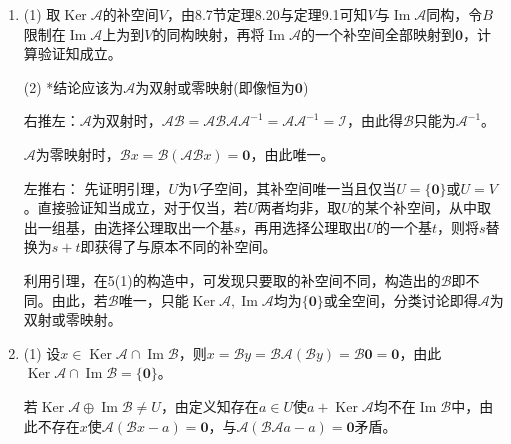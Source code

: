 \documentclass[a4paper,UTF8,fontset=windows]{ctexart}
\DeclareMathOperator{\im}{Im}
\DeclareMathOperator{\Ker}{Ker}
\begin{document}
\begin{enumerate}
(2) 由条件，若$x=\mathcal{A}y,\mathcal{B}x=\mathbf{0}$，则只有$x=\mathbf{0}$，因此限制在$\im\mathcal{A}$上的$\mathcal{B}$为单射。由此存在限制在$\im\mathcal{B}\mathcal{A}$上的$\mathcal{C}$(可验证其为线性映射)使得$\forall x\in\im\mathcal{A},\mathcal{C}\mathcal{B}x=\mathcal{B}x$，令$x=\mathcal{A}y$可发现其已经满足题目条件，再将$\im\mathcal{B}\mathcal{A}$的一个补空间全部映射到$\mathbf{0}$即可。

(3) 对$V$的一组基$\{c_i\}$，由条件可设$\mathcal{B}\mathcal{A}t_i=\mathcal{B}c_i$，则令$\mathcal{C}c_i=t_i$。利用线性性可验证对$V$中的元素均有$\mathcal{B}\mathcal{A}\mathcal{C}c=\mathcal{B}c$，由此知构造出的$\mathcal{C}$符合要求。

\item
(1) 取$\Ker\mathcal{A}$的补空间$V$，由8.7节定理8.20与定理9.1可知$V$与$\im\mathcal{A}$同构，令$B$限制在$\im\mathcal{A}$上为到$V$的同构映射，再将$\im\mathcal{A}$的一个补空间全部映射到$\mathbf{0}$，计算验证知成立。

(2) *结论应该为$\mathcal{A}$为双射或零映射(即像恒为$\mathbf{0}$)

右推左：$\mathcal{A}$为双射时，$\mathcal{A}\mathcal{B}=\mathcal{A}\mathcal{B}\mathcal{A}\mathcal{A}^{-1}=\mathcal{A}\mathcal{A}^{-1}=\mathcal{I}$，由此得$\mathcal{B}$只能为$\mathcal{A}^{-1}$。

$\mathcal{A}$为零映射时，$\mathcal{B}x=\mathcal{B}(\mathcal{A}\mathcal{B}x)=\mathbf{0}$，由此唯一。

左推右：
先证明引理，$U$为$V$子空间，其补空间唯一当且仅当$U=\{\mathbf{0}\}$或$U=V$。直接验证知当成立，对于仅当，若$U$两者均非，取$U$的某个补空间，从中取出一组基，由选择公理取出一个基$s$，再用选择公理取出$U$的一个基$t$，则将$s$替换为$s+t$即获得了与原本不同的补空间。

利用引理，在5(1)的构造中，可发现只要取的补空间不同，构造出的$\mathcal{B}$即不同。由此，若$\mathcal{B}$唯一，只能$\Ker\mathcal{A},\im\mathcal{A}$均为$\{\mathbf{0}\}$或全空间，分类讨论即得$\mathcal{A}$为双射或零映射。

\item
(1) 设$x\in\Ker\mathcal{A}\cap\im\mathcal{B}$，则$x=\mathcal{B}y=\mathcal{B}\mathcal{A}(\mathcal{B}y)=\mathcal{B}\mathbf{0}=\mathbf{0}$，由此$\Ker\mathcal{A}\cap\im\mathcal{B}=\{\mathbf{0}\}$。

若$\Ker\mathcal{A}\oplus\im\mathcal{B}\ne U$，由定义知存在$a\in U$使$a+\Ker\mathcal{A}$均不在$\im\mathcal{B}$中，由此不存在$x$使$\mathcal{A}(\mathcal{B}x-a)=\mathbf{0}$，与$\mathcal{A}(\mathcal{B}\mathcal{A}a-a)=\mathbf{0}$矛盾。


\end{enumerate}
\end{document}
